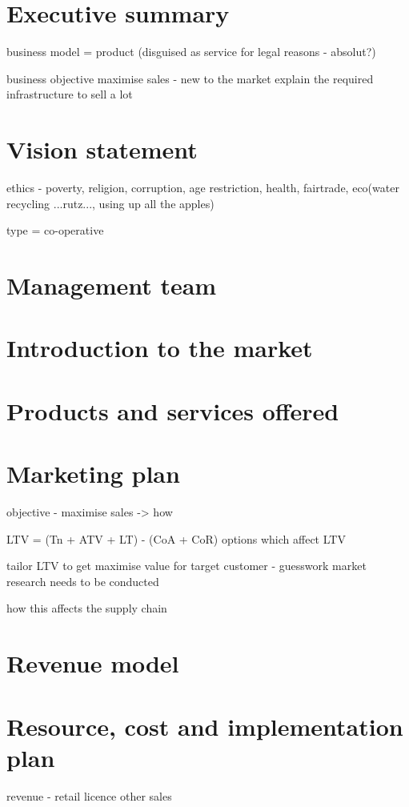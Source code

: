 \documentclass{article}
\begin{document}
\section{Executive summary}

business model = product (disguised as service for legal reasons - absolut?)

business objective 
maximise sales 
 - new to the market
   explain the required infrastructure to sell a lot 

\section{Vision statement}

ethics - poverty, religion, corruption, age restriction, health, fairtrade,
eco(water recycling ...rutz..., using up all the apples)

type = co-operative

\section{Management team}

\section{Introduction to the market}
\section{Products and services offered}
\section{Marketing plan}

objective - maximise sales -> how

LTV = (Tn + ATV + LT) - (CoA + CoR) 
options which affect LTV

tailor LTV to get maximise value for target customer - guesswork market research
needs to be conducted

how this affects the supply chain
\section{Revenue model}
\section{Resource, cost and implementation plan}
revenue
 - retail
   licence
   other sales
\end{document}
